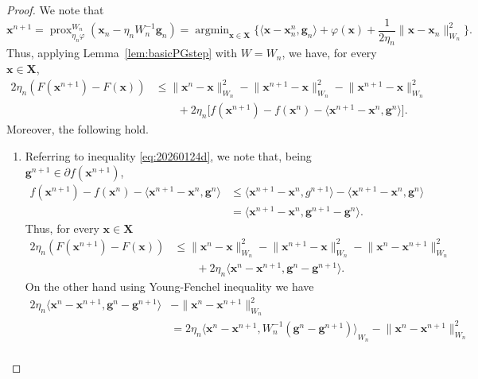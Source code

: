 \documentclass[11pt]{article}
\theoremstyle{plain}
\theoremstyle{definition}
\theoremstyle{remark}
\newcommand{\norm}[1]{\lVert{#1}\rVert}
\newcommand{\scalarp}[1]{\langle{#1}\rangle}
\newcommand{\pair}[2]{{\langle{{#1},{#2}}\rangle}}
\DeclareMathOperator*{\argmin}{argmin}
\DeclareMathOperator{\prox}{prox}
\newcommand{\HH}{X}
\newcommand{\bHH}{\bm{X}}
\newcommand{\bx}{\bm{x}}
\newcommand{\buu}{\bm{g}}
\newcommand{\uu}{g}
\newcommand{\iter}{n}
\newcommand{\reg}{\varphi}
\newcommand{\W}{W}
\begin{document}
\begin{proof}
We note that
\begin{equation*}
\bx^{\iter+1} = \prox^{\W_\iter}_{\eta_\iter \reg} (\bx_\iter- \eta_\iter \W_\iter^{-1}\buu_\iter) 
= \argmin_{\bx\in \bHH}\Big\{ \scalarp{\bx-\bx^\iter_\iter, \buu_\iter} + \reg(\bx) + \frac{1}{2\eta_\iter} \norm{\bx-\bx_\iter}^2_{\W_\iter}\Big\}.
\end{equation*}
Thus, 
applying Lemma~\ref{lem:basicPGstep} with $\W= \W_\iter$,
we have, for every $\bx\in \bHH$,
\begin{align}
\label{eq:20260124d}
    \nonumber 2\eta_\iter (F(\bx^{\iter+1})- F(\bx)) & \leq \norm{\bx^\iter\!-\bx}_{\W_\iter}^2\! - \norm{\bx^{\iter+1}-\bx}_{\W_\iter}^2 \!- \norm{\bx^{\iter+1}\!-\bx}_{\W_\iter}^2 \\ & \qquad +2\eta_\iter \big[f(\bx^{\iter+1})-f(\bx^\iter)- \pair{\bx^{\iter+1}\!-\bx^\iter}{\buu^\iter}\big].
\end{align}
Moreover, the following hold. 
\begin{enumerate}[label={\rm (\roman*)}]
\item\label{rmk2_i} Referring to inequality \eqref{eq:20260124d}, we note that, being $\buu^{\iter+1}\in \partial f(\bx^{\iter+1})$,
\begin{align*}
f(\bx^{\iter+1})-f(\bx^\iter)- \pair{\bx^{\iter+1}-\bx^\iter}{\buu^n} & \leq \pair{\bx^{\iter+1}-\bx^\iter}{\uu^{\iter+1}}-\pair{\bx^{\iter+1}-\bx^\iter}{\buu^{\iter}} \\
&= \pair{\bx^{\iter+1}-\bx^\iter}{\buu^{\iter+1}-\buu^\iter}.
\end{align*}
Thus, for every $\bx\in \bHH$
\begin{align*}
2\eta_\iter (F(\bx^{\iter+1})- F(\bx)) & \leq \norm{\bx^\iter-\bx}_{\W_\iter}^2 - \norm{\bx^{\iter+1}-\bx}_{\W_\iter}^2 - \norm{\bx^\iter-\bx^{\iter+1}}_{\W_\iter}^2 \\
& \qquad +2\eta_\iter 
\pair{\bx^\iter-\bx^{\iter+1}}{\buu^\iter - \buu^{\iter+1}}.
\end{align*}
On the other hand using Young-Fenchel inequality we have
\begin{align*}
2\eta_{\iter} \pair{\bx^\iter-\bx^{\iter+1}}{\buu^\iter - \buu^{\iter+1}}&-\norm{\bx^\iter-\bx^{\iter+1}}_{\W_\iter}^2 \\[1ex]
& = 2\eta_\iter \pair{\bx^\iter-\bx^{\iter+1}}{\W_\iter^{-1}(\buu^\iter - \buu^{\iter+1})}_{\W_\iter}-\norm{\bx^\iter-\bx^{\iter+1}}_{\W_\iter}^2\\[1ex]

\end{align*}
\end{enumerate}
\end{proof}
\end{document}
